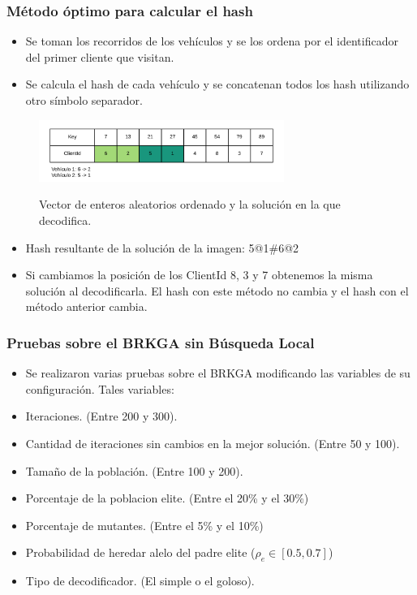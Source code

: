 \documentclass{beamer}
\begin{document}
\begin{frame}
\frametitle{Método óptimo para calcular el hash}

\begin{itemize}
    \item Se toman los recorridos de los vehículos y se los ordena por el identificador del primer cliente que visitan. 
    \pause
    \item Se calcula el hash de cada vehículo y se concatenan todos los hash utilizando otro símbolo separador.
\end{itemize}

\begin{figure}[h]
	\caption{Vector de enteros aleatorios ordenado y la solución en la que decodifica.}
	\centering
	\includegraphics[width=8cm]{DistribucionClientesDecoSimple}
	\label{fig:DistribucionClientesDecoSimple2}
\end{figure}

\begin{itemize}
    \item Hash resultante de la solución de la imagen: 5@1\#6@2
    \pause
    \item Si cambiamos la posición de los ClientId 8, 3 y 7 obtenemos la misma solución al decodificarla. El hash con este método no cambia y el hash con el método anterior cambia.
\end{itemize}

\end{frame}


\begin{frame}
\frametitle{Pruebas sobre el BRKGA sin Búsqueda Local}

\begin{itemize}
    \item Se realizaron varias pruebas sobre el BRKGA modificando las variables de su configuración. Tales variables:
    \pause
    \item Iteraciones. (Entre 200 y 300).
    \pause
    \item Cantidad de iteraciones sin cambios en la mejor solución. (Entre 50 y 100).
    \pause
    \item Tamaño de la población. (Entre 100 y 200).
    \pause
    \item Porcentaje de la poblacion elite. (Entre el 20\% y el 30\%)
    \pause
    \item Porcentaje de mutantes. (Entre el 5\% y el 10\%)
    \pause
    \item Probabilidad de heredar alelo del padre elite ($\rho_e \in [0.5,0.7]$)
    \pause
    \item Tipo de decodificador. (El simple o el goloso).
\end{itemize}

\end{frame}
\end{document}
